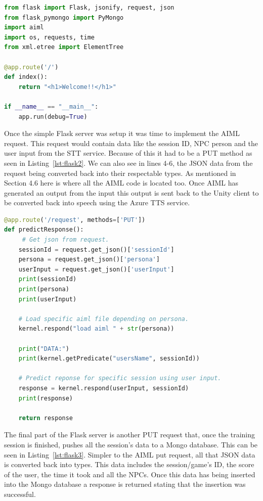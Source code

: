 \begin{lstlisting}[caption={Basic Flask GET request},label={lst:flask1},language=python]
from flask import Flask, jsonify, request, json
from flask_pymongo import PyMongo
import aiml
import os, requests, time
from xml.etree import ElementTree

@app.route('/')
def index():
    return "<h1>Welcome!!</h1>"
    
if __name__ == "__main__":
    app.run(debug=True)
\end{lstlisting}

Once the simple Flask server was setup it was time to implement the AIML request. This request would contain data like the session ID, NPC person and the user input from the STT service. Because of this it had to be a PUT method as seen in Listing~\ref{lst:flask2}. We can also see in lines 4-6, the JSON data from the request being converted back into their respectable types. As mentioned in Section 4.6 here is where all the AIML code is located too. Once AIML has generated an output from the input this output is sent back to the Unity client to be converted back into speech using the Azure TTS service. 

\begin{lstlisting}[caption={Flask PUT request to generate AIML response},label={lst:flask2},language=python]
@app.route('/request', methods=['PUT'])
def predictResponse():
     # Get json from request.
    sessionId = request.get_json()['sessionId']
    persona = request.get_json()['persona']
    userInput = request.get_json()['userInput']
    print(sessionId)
    print(persona)
    print(userInput)

    # Load specific aiml file depending on persona.
    kernel.respond("load aiml " + str(persona))

    print("DATA:")
    print(kernel.getPredicate("usersName", sessionId))

    # Predict reponse for specific session using user input.
    response = kernel.respond(userInput, sessionId)
    print(response)

    return response
\end{lstlisting}

The final part of the Flask server is another PUT request that, once the training session is finished, pushes all the session's data to a Mongo database. This can be seen in Listing~\ref{lst:flask3}. Simpler to the AIML put request, all that JSON data is converted back into types. This data includes the session/game's ID, the score of the user, the time it took and all the NPCs. Once this data has being inserted into the Mongo database a response is returned stating that the insertion was successful. 

